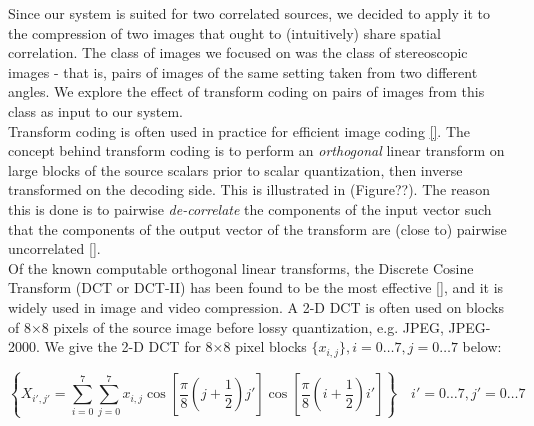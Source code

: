 Since our system is suited for two correlated sources, we decided to apply it to the compression of two images that ought to (intuitively) share spatial correlation. The class of images we focused on was the class of stereoscopic images - that is, pairs of images of the same setting taken from two different angles. We explore the effect of transform coding on pairs of images from this class as input to our system.\\

Transform coding is often used in practice for efficient image coding \ref{}. The concept behind transform coding is to perform an \emph{orthogonal} linear transform on large blocks of the source scalars prior to scalar quantization, then inverse transformed on the decoding side. This is illustrated in (Figure??). The reason this is done is to pairwise \emph{de-correlate} the components of the input vector such that the components of the output vector of the transform are (close to) pairwise uncorrelated \ref{}.\\

Of the known computable orthogonal linear transforms, the Discrete Cosine Transform (DCT or DCT-II) has been found to be the most effective \ref{}, and it is widely used in image and video compression. A 2-D DCT is often used on blocks of 8$\times$8 pixels of the source image before lossy quantization, e.g. JPEG, JPEG-2000. We give the 2-D DCT for 8$\times$8 pixel blocks $\{x_{i,j}\}, i=0\ldots 7, j=0\ldots 7$ below:

\begin{equation}
    \left\{X_{i', j'}=\sum_{i=0}^7\sum_{j=0}^7
        x_{i,j}
            \cos\left[
                \frac{\pi}{8}\left(j+\frac{1}{2}\right)j'
            \right]
            \cos\left[
            \frac{\pi}{8}\left(i + \frac{1}{2}\right)i'
            \right]\right\}\quad i'=0\ldots 7, j'=0\ldots 7
\end{equation}

